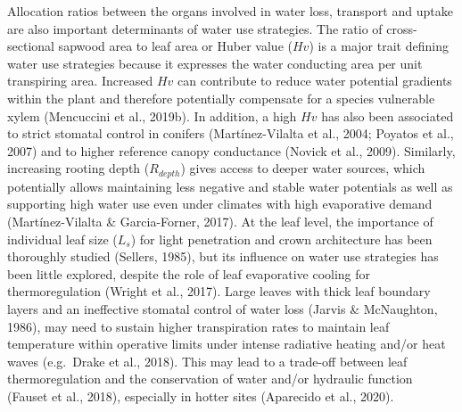 \documentclass[11pt,twoside]{reedthesis}
\begin{document}
Allocation ratios between the organs involved in water loss, transport
and uptake are also important determinants of water use strategies. The
ratio of cross-sectional sapwood area to leaf area or Huber value
(\(Hv\)) is a major trait defining water use strategies because it
expresses the water conducting area per unit transpiring area. Increased
\(Hv\) can contribute to reduce water potential gradients within the
plant and therefore potentially compensate for a species vulnerable
xylem (Mencuccini et al., 2019b). In addition, a high \(Hv\) has also
been associated to strict stomatal control in conifers (Martínez-Vilalta
et al., 2004; Poyatos et al., 2007) and to higher reference canopy
conductance (Novick et al., 2009). Similarly, increasing rooting depth
(\(R_{depth}\)) gives access to deeper water sources, which potentially
allows maintaining less negative and stable water potentials as well as
supporting high water use even under climates with high evaporative
demand (Martínez-Vilalta \& Garcia-Forner, 2017). At the leaf level, the
importance of individual leaf size (\(L_s\)) for light penetration and
crown architecture has been thoroughly studied (Sellers, 1985), but its
influence on water use strategies has been little explored, despite the
role of leaf evaporative cooling for thermoregulation (Wright et al.,
2017). Large leaves with thick leaf boundary layers and an ineffective
stomatal control of water loss (Jarvis \& McNaughton, 1986), may need to
sustain higher transpiration rates to maintain leaf temperature within
operative limits under intense radiative heating and/or heat waves
(e.g.~Drake et al., 2018). This may lead to a trade-off between leaf
thermoregulation and the conservation of water and/or hydraulic function
(Fauset et al., 2018), especially in hotter sites (Aparecido et al.,
2020).\par
\end{document}
